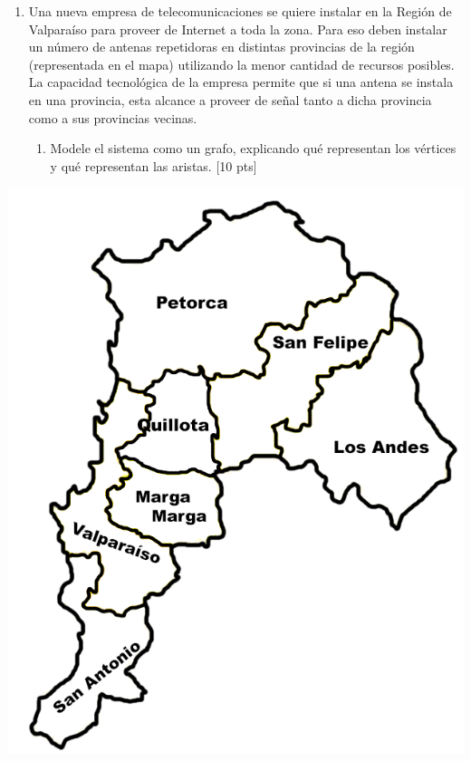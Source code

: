 \documentclass[letter,12pt,oneside]{book}
\theoremstyle{definition}
\begin{document}
\begin{minipage}[t]{0.57\textwidth}
  \vspace{-3cm}
  
  \begin{enumerate}
    \item Una nueva empresa de telecomunicaciones se quiere instalar en la Región de Valparaíso para proveer de Internet a toda la zona. Para eso deben instalar un número de antenas repetidoras en distintas provincias de la región (representada en el mapa) utilizando la menor cantidad de recursos posibles. La capacidad tecnológica de la empresa permite que si una antena se instala en una provincia, esta alcance a proveer de señal tanto a dicha provincia como a sus provincias vecinas.
    \begin{enumerate}
        \item Modele el sistema como un grafo, explicando qué representan los vértices y qué representan las aristas. \tabto{38ex} [10 pts]
    \end{enumerate}
  \end{enumerate}
\end{minipage}
\begin{minipage}[h]{0.4\textwidth}
    \includegraphics[width=\textwidth]{./image/cap6/mapa-valpo.png}
\end{minipage}
\end{document}
